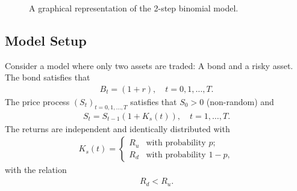 \documentclass{article}
\theoremstyle{definition}
\numberwithin{equation}{section}
\begin{document}
\begin{figure}
    \centering
    \caption{A graphical representation of the 2-step binomial model.}
    \label{fig:2_step_binomial_model}
\end{figure}

\subsection{Model Setup}
Consider a model where only two assets are traded: A bond and a risky asset.
The bond satisfies that
\begin{align}
    B_t = (1+r), \quad t = 0,1, \ldots, T.
\end{align}
The price process $(S_t)_{t = 0,1, \ldots, T}$ satisfies that $S_0 > 0$ (non-random) and
\begin{align}
    S_t = S_{t - 1} (1 + K_s(t)), \quad t = 1, \ldots, T.
\end{align}
The returns are independent and identically distributed with
\begin{align}
    K_s(t) =
    \begin{cases}
        R_u &\text{with probability } p; \\
        R_d &\text{with probability } 1-p,
    \end{cases}
\end{align}
with the relation
\begin{align}
    R_d < R_u.
\end{align}
\end{document}
